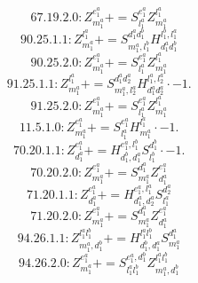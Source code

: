 \documentclass[letterpaper,10pt,fleqn,leqno,onecolumn]{article}
\begin{document}
\begin{equation} \;\;\;\;\;\;  67.19.2.0: Z^{e_{1}^{a}}_{m_{1}^{a}}+=S^{e_{1}^{a}}_{l_{1}^{a}}Z^{l_{1}^{a}}_{m_{1}^{a}} \end{equation}
\begin{equation} \;\;\;\;\;\;  90.25.1.1: Z^{l_{1}^{a}}_{m_{1}^{a}}+=S^{d_{1}^{a}d_{1}^{b}}_{m_{1}^{a},l_{1}^{b}}H^{l_{1}^{b},l_{1}^{a}}_{d_{1}^{a}d_{1}^{b}} \end{equation}
\begin{equation} \;\;\;\;\;\;  90.25.2.0: Z^{e_{1}^{a}}_{m_{1}^{a}}+=S^{e_{1}^{a}}_{l_{1}^{a}}Z^{l_{1}^{a}}_{m_{1}^{a}} \end{equation}
\begin{equation} \;\;\;\;\;\;  91.25.1.1: Z^{l_{1}^{a}}_{m_{1}^{a}}+=S^{d_{1}^{a}d_{2}^{a}}_{m_{1}^{a},l_{2}^{a}}H^{l_{1}^{a},l_{2}^{a}}_{d_{1}^{a}d_{2}^{a}}\cdot -1. \end{equation}
\begin{equation} \;\;\;\;\;\;  91.25.2.0: Z^{e_{1}^{a}}_{m_{1}^{a}}+=S^{e_{1}^{a}}_{l_{1}^{a}}Z^{l_{1}^{a}}_{m_{1}^{a}} \end{equation}
\begin{equation} \;\;\;\;\;\;  11.5.1.0: Z^{e_{1}^{a}}_{m_{1}^{a}}+=S^{e_{1}^{a}}_{l_{1}^{a}}H^{l_{1}^{a}}_{m_{1}^{a}}\cdot -1. \end{equation}
\begin{equation} \;\;\;\;\;\;  70.20.1.1: Z^{e_{1}^{a}}_{d_{1}^{a}}+=H^{e_{1}^{a},l_{1}^{b}}_{d_{1}^{b},d_{1}^{a}}S^{d_{1}^{b}}_{l_{1}^{b}}\cdot -1. \end{equation}
\begin{equation} \;\;\;\;\;\;  70.20.2.0: Z^{e_{1}^{a}}_{m_{1}^{a}}+=S^{d_{1}^{a}}_{m_{1}^{a}}Z^{e_{1}^{a}}_{d_{1}^{a}} \end{equation}
\begin{equation} \;\;\;\;\;\;  71.20.1.1: Z^{e_{1}^{a}}_{d_{1}^{a}}+=H^{e_{1}^{a},l_{1}^{a}}_{d_{1}^{a},d_{2}^{a}}S^{d_{2}^{a}}_{l_{1}^{a}} \end{equation}
\begin{equation} \;\;\;\;\;\;  71.20.2.0: Z^{e_{1}^{a}}_{m_{1}^{a}}+=S^{d_{1}^{a}}_{m_{1}^{a}}Z^{e_{1}^{a}}_{d_{1}^{a}} \end{equation}
\begin{equation} \;\;\;\;\;\;  94.26.1.1: Z^{l_{1}^{a}l_{1}^{b}}_{m_{1}^{a},d_{1}^{b}}+=H^{l_{1}^{a}l_{1}^{b}}_{d_{1}^{b},d_{1}^{a}}S^{d_{1}^{a}}_{m_{1}^{a}} \end{equation}
\begin{equation} \;\;\;\;\;\;  94.26.2.0: Z^{e_{1}^{a}}_{m_{1}^{a}}+=S^{e_{1}^{a},d_{1}^{b}}_{l_{1}^{a}l_{1}^{b}}Z^{l_{1}^{a}l_{1}^{b}}_{m_{1}^{a},d_{1}^{b}} \end{equation}
\end{document}
